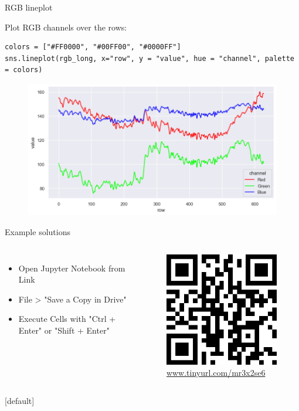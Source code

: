 \documentclass[compress%
,aspectratio=169%
]{beamer}
\begin{document}
\begin{frame}[fragile]{RGB lineplot}

Plot RGB channels over the rows:
\begin{lstlisting}
colors = ["#FF0000", "#00FF00", "#0000FF"]
sns.lineplot(rgb_long, x="row", y = "value", hue = "channel", palette = colors)
\end{lstlisting}
\begin{figure}
    \centering
    \includegraphics[width = 0.6\linewidth]{img/rgb_lines.png}
\end{figure}
\end{frame}



\begin{frame}{Example solutions}
\begin{columns}
    \begin{itemize}
    \item Open Jupyter Notebook from Link
    \item File > "Save a Copy in Drive"
    \item Execute Cells with "Ctrl + Enter" or "Shift + Enter"
\end{itemize}
    \begin{figure}
    \centering
    \includegraphics[width = 0.7\linewidth]{img/example_qr.png}
    \caption{\alert{\url{www.tinyurl.com/mr3x2se6}}}
\end{figure}
\end{columns}

\end{frame}
[default]
\end{document}

